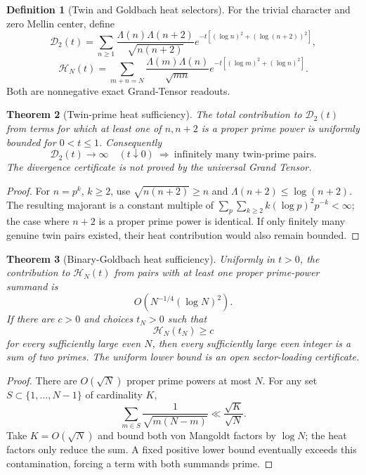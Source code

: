 \documentclass[11pt]{article}
\newtheorem{theorem}{Theorem}[section]
\theoremstyle{definition}
\newtheorem{definition}[theorem]{Definition}
\theoremstyle{remark}
\begin{document}
\begin{definition}[Twin and Goldbach heat selectors]
For the trivial character and zero Mellin center, define
\[
 \mathcal D_2(t)
 =\sum_{n\ge1}\frac{\Lambda(n)\Lambda(n+2)}{\sqrt{n(n+2)}}
 e^{-t[(\log n)^2+(\log(n+2))^2]},
\]
\[
 \mathcal H_N(t)
 =\sum_{m+n=N}\frac{\Lambda(m)\Lambda(n)}{\sqrt{mn}}
 e^{-t[(\log m)^2+(\log n)^2]}.
\]
Both are nonnegative exact Grand-Tensor readouts.
\end{definition}

\begin{theorem}[Twin-prime heat sufficiency]
\label{thm:twin-heat-master}
The total contribution to $\mathcal D_2(t)$ from terms for which at least one
of $n,n+2$ is a proper prime power is uniformly bounded for $0<t\le1$.
Consequently
\[
 \boxed{
 \mathcal D_2(t)\longrightarrow\infty\quad(t\downarrow0)
 \ \Longrightarrow\ 
 \text{infinitely many twin-prime pairs}.}
\]
The divergence certificate is not proved by the universal Grand Tensor.
\end{theorem}

\begin{proof}
For $n=p^k$, $k\ge2$, use $\sqrt{n(n+2)}\ge n$ and
$\Lambda(n+2)\le\log(n+2)$.  The resulting majorant is a constant multiple
of
$\sum_p\sum_{k\ge2}k(\log p)^2p^{-k}<\infty$; the case where $n+2$ is a
proper prime power is identical.  If only finitely many genuine twin pairs
existed, their heat contribution would also remain bounded.
\end{proof}

\begin{theorem}[Binary-Goldbach heat sufficiency]
\label{thm:Goldbach-heat-master}
Uniformly in $t>0$, the contribution to $\mathcal H_N(t)$ from pairs with at
least one proper prime-power summand is
\[
 O\!\left(N^{-1/4}(\log N)^2\right).
\]
If there are $c>0$ and choices $t_N>0$ such that
\[
 \boxed{\mathcal H_N(t_N)\ge c}
\]
for every sufficiently large even $N$, then every sufficiently large even
integer is a sum of two primes.  The uniform lower bound is an open
sector-loading certificate.
\end{theorem}

\begin{proof}
There are $O(\sqrt N)$ proper prime powers at most $N$.  For any set
$S\subset\{1,\ldots,N-1\}$ of cardinality $K$,
\[
 \sum_{m\in S}\frac1{\sqrt{m(N-m)}}
 \ll\frac{\sqrt K}{\sqrt N}.
\]
Take $K=O(\sqrt N)$ and bound both von Mangoldt factors by $\log N$; the heat
factors only reduce the sum.  A fixed positive lower bound eventually exceeds
this contamination, forcing a term with both summands prime.
\end{proof}
\end{document}

